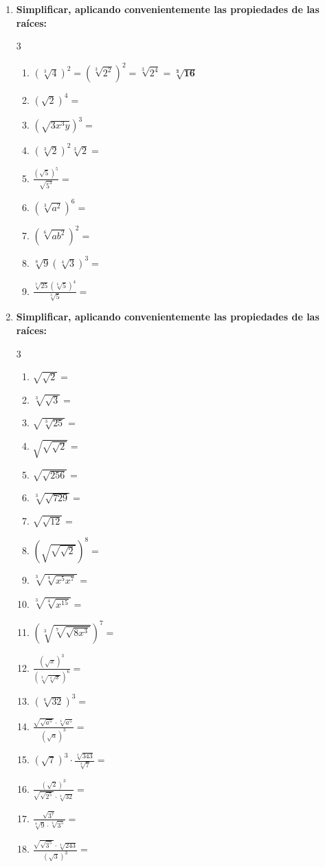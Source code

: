 \documentclass[10pt, a4paper]{article}
\begin{document}
\begin{enumerate}
    \item \textbf{Simplificar, aplicando convenientemente las propiedades de las raíces:}
    \begin{multicol}{3}
    \begin{enumerate}[label=\alph*)]
        \item $(\sqrt[3]{4})^2 = (\sqrt[3]{2^2})^2 = \sqrt[3]{2^4} = \mathbf{\sqrt[3]{16}}$
        \item $(\sqrt{2})^4 =$
        \item $(\sqrt{3x^3 y})^3 =$
        \item $(\sqrt[3]{2})^2 \sqrt[3]{2} =$
        \item $\frac{(\sqrt{5})^5}{\sqrt{5^3}} =$
        \item $(\sqrt[3]{a^2})^6 =$
        \item $(\sqrt[6]{a b^2})^2 =$
        \item $\sqrt[8]{9}(\sqrt[4]{3})^3 =$
        \item $\frac{\sqrt[3]{25}(\sqrt[6]{5})^4}{\sqrt[3]{5}} =$
    \end{enumerate}
    \end{multicol}

    \item \textbf{Simplificar, aplicando convenientemente las propiedades de las raíces:}
    \begin{multicol}{3}
    \begin{enumerate}[label=\alph*)]
        \item $\sqrt{\sqrt{2}} =$
        \item $\sqrt[3]{\sqrt{3}} =$
        \item $\sqrt{\sqrt[3]{25}} =$
        \item $\sqrt{\sqrt{\sqrt{2}}} =$
        \item $\sqrt{\sqrt{256}} =$
        \item $\sqrt[3]{\sqrt{729}} =$
        \item $\sqrt{\sqrt{12}} =$
        \item $(\sqrt{\sqrt{\sqrt{2}}})^8 =$
        \item $\sqrt[3]{\sqrt[4]{x^5 x^7}} =$
        \item $\sqrt[3]{\sqrt[4]{x^{15}}} =$
        \item $(\sqrt[3]{\sqrt[7]{\sqrt{8x^3}}})^7 =$
        \item $\frac{(\sqrt{x})^3}{(\sqrt[3]{\sqrt[4]{x}})^6} =$
        \item $(\sqrt[6]{32})^3 =$
        \item $\frac{\sqrt{\sqrt{a^5}}\cdot\sqrt[4]{a^5}}{(\sqrt{a})^3} =$
        \item $(\sqrt{7})^3 \cdot \frac{\sqrt[4]{343}}{\sqrt[4]{7}} =$
        \item $\frac{(\sqrt{2})^3}{\sqrt{\sqrt{2^5}}\cdot\sqrt[4]{32}} =$
        \item $\frac{\sqrt{3^7}}{\sqrt[8]{9}\cdot\sqrt[4]{3^5}} =$
        \item $\frac{\sqrt{\sqrt{3^5}}\cdot\sqrt[4]{243}}{(\sqrt{3})^3} =$
    \end{enumerate}
    \end{multicol}


\end{enumerate}
\end{document}

